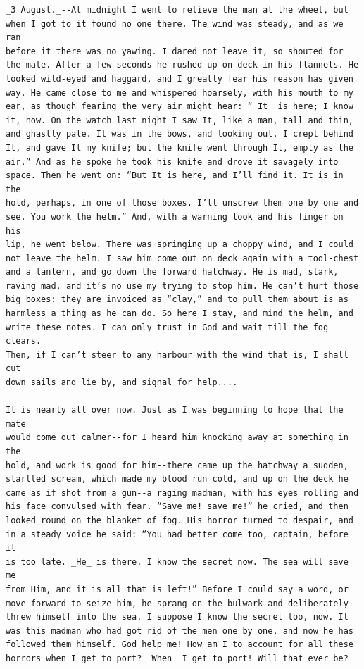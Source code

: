 \documentclass{article}
\begin{document}
\begin{verbatim}
_3 August._--At midnight I went to relieve the man at the wheel, but
when I got to it found no one there. The wind was steady, and as we ran
before it there was no yawing. I dared not leave it, so shouted for
the mate. After a few seconds he rushed up on deck in his flannels. He
looked wild-eyed and haggard, and I greatly fear his reason has given
way. He came close to me and whispered hoarsely, with his mouth to my
ear, as though fearing the very air might hear: “_It_ is here; I know
it, now. On the watch last night I saw It, like a man, tall and thin,
and ghastly pale. It was in the bows, and looking out. I crept behind
It, and gave It my knife; but the knife went through It, empty as the
air.” And as he spoke he took his knife and drove it savagely into
space. Then he went on: “But It is here, and I’ll find it. It is in the
hold, perhaps, in one of those boxes. I’ll unscrew them one by one and
see. You work the helm.” And, with a warning look and his finger on his
lip, he went below. There was springing up a choppy wind, and I could
not leave the helm. I saw him come out on deck again with a tool-chest
and a lantern, and go down the forward hatchway. He is mad, stark,
raving mad, and it’s no use my trying to stop him. He can’t hurt those
big boxes: they are invoiced as “clay,” and to pull them about is as
harmless a thing as he can do. So here I stay, and mind the helm, and
write these notes. I can only trust in God and wait till the fog clears.
Then, if I can’t steer to any harbour with the wind that is, I shall cut
down sails and lie by, and signal for help....

It is nearly all over now. Just as I was beginning to hope that the mate
would come out calmer--for I heard him knocking away at something in the
hold, and work is good for him--there came up the hatchway a sudden,
startled scream, which made my blood run cold, and up on the deck he
came as if shot from a gun--a raging madman, with his eyes rolling and
his face convulsed with fear. “Save me! save me!” he cried, and then
looked round on the blanket of fog. His horror turned to despair, and
in a steady voice he said: “You had better come too, captain, before it
is too late. _He_ is there. I know the secret now. The sea will save me
from Him, and it is all that is left!” Before I could say a word, or
move forward to seize him, he sprang on the bulwark and deliberately
threw himself into the sea. I suppose I know the secret too, now. It
was this madman who had got rid of the men one by one, and now he has
followed them himself. God help me! How am I to account for all these
horrors when I get to port? _When_ I get to port! Will that ever be?


\end{verbatim}
\end{document}
